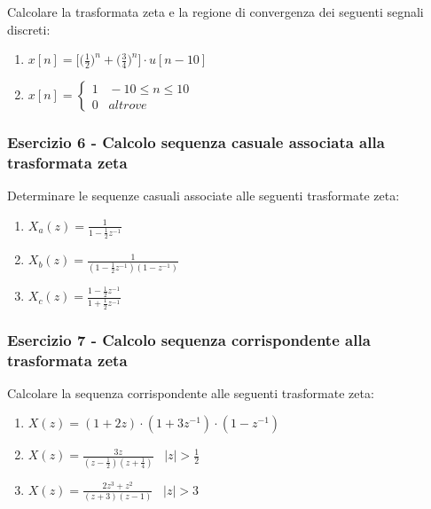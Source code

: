 \documentclass[../main.tex]{subfiles}
\begin{document}
Calcolare la trasformata zeta e la regione di convergenza dei seguenti segnali discreti:

\begin{enumerate}
	\item[\textbf{1)}] $x[n] = \big[ \big(\frac{1}{2}\big)^n + \big(\frac{3}{4}\big)^n\big] \cdot u[n-10]$
	\item[\textbf{2)}] $x[n] = \begin{cases}
		1 \hspace{10pt} -10 \leq n \leq 10 \\
		0 \hspace{10pt} \unit{altrove}
	\end{cases}$
\end{enumerate}

\subsubsection{Esercizio 6 - Calcolo sequenza casuale associata alla trasformata zeta}

Determinare le sequenze casuali associate alle seguenti trasformate zeta:

\begin{enumerate}
	\item[\textbf{1)}] $X_a(z) = \frac{1}{1 - \frac{1}{2}z^{-1}}$
	\item[\textbf{2)}] $X_b(z) = \frac{1}{(1 - \frac{1}{2}z^{-1})(1-z^{-1})}$
	\item[\textbf{3)}] $X_c(z) = \frac{1 - \frac{1}{2}z^{-1}}{1 + \frac{1}{2}z^{-1}}$
\end{enumerate}


\subsubsection{Esercizio 7 - Calcolo sequenza corrispondente alla trasformata zeta}

Calcolare la sequenza corrispondente alle seguenti trasformate zeta:

\begin{enumerate}
	\item[\textbf{1)}] $X(z) = (1 + 2z) \cdot (1 + 3z^{-1}) \cdot (1 - z^{-1}) $
	\item[\textbf{2)}] $X(z) = \frac{3z}{(z - \frac{1}{2})(z + \frac{1}{4})} \hspace{10pt} |z| > \frac{1}{2}$ 
	\item[\textbf{3)}] $X(z) = \frac{2z^3 + z^2}{(z+3)(z-1)}  \hspace{10pt} |z| > 3$
\end{enumerate}
\end{document}
